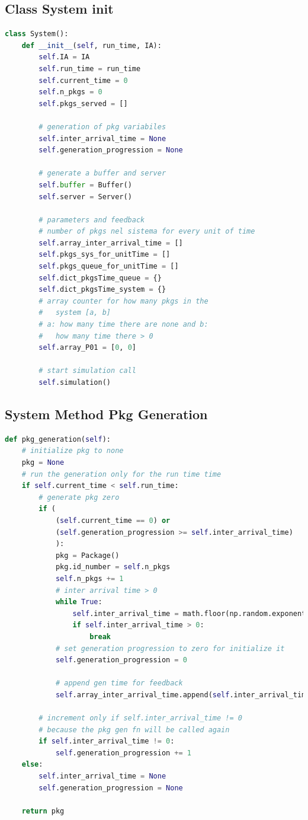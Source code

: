 \documentclass[12pt,a4paper]{article}
\begin{document}
\subsection{Class System init}
\begin{lstlisting}[language=Python, caption=Class System init]
class System():
    def __init__(self, run_time, IA):
        self.IA = IA
        self.run_time = run_time
        self.current_time = 0
        self.n_pkgs = 0
        self.pkgs_served = []

        # generation of pkg variabiles
        self.inter_arrival_time = None
        self.generation_progression = None

        # generate a buffer and server
        self.buffer = Buffer()
        self.server = Server()

        # parameters and feedback
        # number of pkgs nel sistema for every unit of time 
        self.array_inter_arrival_time = []
        self.pkgs_sys_for_unitTime = []
        self.pkgs_queue_for_unitTime = []
        self.dict_pkgsTime_queue = {}
        self.dict_pkgsTime_system = {}
        # array counter for how many pkgs in the 
        # 	system [a, b]
        # a: how many time there are none and b: 
        # 	how many time there > 0
        self.array_P01 = [0, 0]

        # start simulation call
        self.simulation()
\end{lstlisting}

\subsection{System Method Pkg Generation}
\begin{lstlisting}[language=Python, caption=System Method Pkg Generation]
def pkg_generation(self):
    # initialize pkg to none 
    pkg = None
    # run the generation only for the run time time 
    if self.current_time < self.run_time:
        # generate pkg zero
        if (
            (self.current_time == 0) or 
            (self.generation_progression >= self.inter_arrival_time)
            ):
            pkg = Package()
            pkg.id_number = self.n_pkgs
            self.n_pkgs += 1
            # inter arrival time > 0
            while True:
                self.inter_arrival_time = math.floor(np.random.exponential(self.IA))
                if self.inter_arrival_time > 0:
                    break
            # set generation progression to zero for initialize it 
            self.generation_progression = 0

            # append gen time for feedback 
            self.array_inter_arrival_time.append(self.inter_arrival_time)
        
        # increment only if self.inter_arrival_time != 0 
        # because the pkg gen fn will be called again
        if self.inter_arrival_time != 0:
            self.generation_progression += 1
    else: 
        self.inter_arrival_time = None
        self.generation_progression = None
    
    return pkg 
\end{lstlisting}
\end{document}
